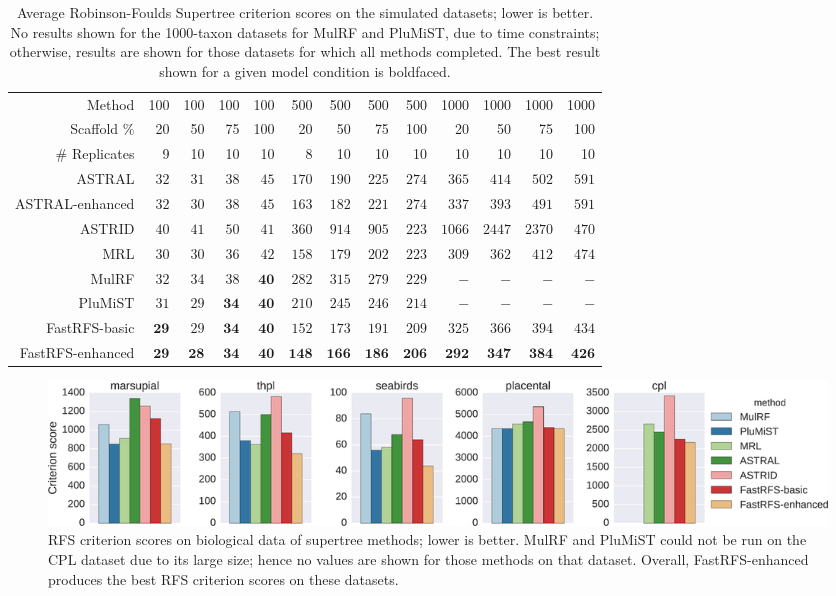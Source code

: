 \begin{table}[!ht]
\small
\begin{tabular}{|r|rrrr|rrrr|rrrr|}
\hline
Method&100 & 100 & 100 & 100 & 500 & 500 & 500 & 500 & 1000 & 1000 & 1000 & 1000\\
Scaffold \% &20 & 50 & 75 & 100 & 20 & 50 & 75 & 100 & 20 & 50 & 75 & 100\\
\# Replicates & 9 & 10 & 10 & 10 & 8 & 10 & 10 & 10 & 10 & 10 & 10 & 10 \\
\hline 
\hline
ASTRAL&	$32$&	$31$&	$38$&	$45$&	$170$&	$190$&	$225$&	$274$&	$365$&	$414$&	$502$&	$591$\\
ASTRAL-enhanced&	$32$&	$30$&	$38$&	$45$&	$163$&	$182$&	$221$&	$274$&	$337$&	$393$&	$491$&	$591$\\
ASTRID&	$40$&	$41$&	$50$&	$41$&	$360$&	$914$&	$905$&	$223$&	$1066$&	$2447$&	$2370$&	$470$\\
MRL&	$30$&	$30$&	$36$&	$42$&	$158$&	$179$&	$202$&	$223$&	$309$&	$362$&	$412$&	$474$\\
MulRF&	$32$&	$34$&	$38$&	$\mathbf{40}$&	$282$&	$315$&	$279$&	$229$&	$-$&	$-$&	$-$&	$-$\\
PluMiST&	$31$&	$29$&	$\mathbf{34}$&	$\mathbf{40}$&	$210$&	$245$&	$246$&	$214$&	$-$&	$-$&	$-$&	$-$\\
\hline
FastRFS-basic&	$\mathbf{29}$&	$29$&	$\mathbf{34}$&	$\mathbf{40}$&	$152$&	$173$&	$191$&	$209$&	$325$&	$366$&	$394$&	$434$\\
FastRFS-enhanced&	$\mathbf{29}$&	$\mathbf{28}$&	$\mathbf{34}$&	$\mathbf{40}$&	$\mathbf{148}$&	$\mathbf{166}$&	$\mathbf{186}$&	$\mathbf{206}$&	$\mathbf{292}$&	$\mathbf{347}$&	$\mathbf{384}$&	$\mathbf{426}$\\
\hline
\end{tabular}
\caption[RFS criterion scores on simulated datasets for FastRFS and other methods]{Average Robinson-Foulds Supertree criterion scores on the
simulated datasets; lower is better.
No results shown for the 1000-taxon 
datasets for MulRF and PluMiST, due to time constraints; otherwise,
results are shown for those datasets for which all methods completed.
The best result shown  for a given model condition
is boldfaced.
}
\label{fastrfs::table:simulated-critscores}
\end{table}




\begin{figure}
    \centering
    \includegraphics[width=\textwidth]{fastrfs-figs/bio-critscores.eps}
    \caption[Comparison of FastRFS and other supertree methods on five biological datasets with respect to RFS criterion score]{RFS criterion scores on biological data 
of supertree methods; lower is better.
MulRF and PluMiST could not be run on the CPL dataset due to its large size; hence
no values are shown for those methods on that dataset.
Overall, FastRFS-enhanced produces the best RFS criterion scores on these datasets.
}
    \label{fastrfs::fig:bio-critscores}
\end{figure}


